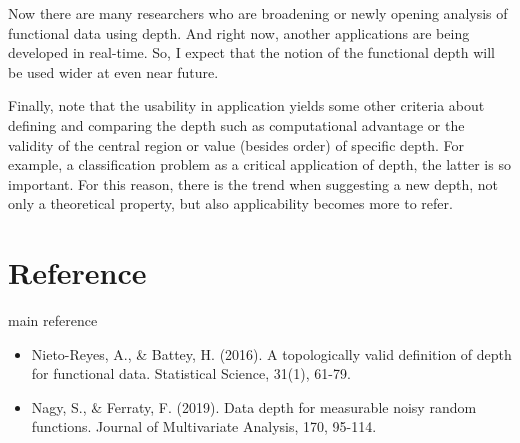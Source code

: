 \documentclass[aspectratio=169,ignorenonframetext,9pt]{beamer}
\theoremstyle{plain}
\theoremstyle{definition}
\begin{document}
Now there are many researchers who are broadening or newly opening analysis of functional data using depth.
And right now, another applications are being developed in real-time.
So, I expect that the notion of the functional depth will be used wider at even near future.

Finally, note that the usability in application yields some other criteria about defining and comparing the depth
such as computational advantage or the validity of the central region or value (besides order) of specific depth.
For example, a classification problem as a critical application of depth, the latter is so important.
For this reason, there is the trend when suggesting a new depth, not only a theoretical property, 
but also applicability becomes more to refer.

\section{Reference}
\begin{frame}{main reference}
    \begin{itemize}
        \item Nieto-Reyes, A., \& Battey, H. (2016). A topologically valid definition of depth for functional data. Statistical Science, 31(1), 61-79.
        \item Nagy, S., \& Ferraty, F. (2019). Data depth for measurable noisy random functions. Journal of Multivariate Analysis, 170, 95-114.
    \end{itemize}
\end{frame}
\end{document}
